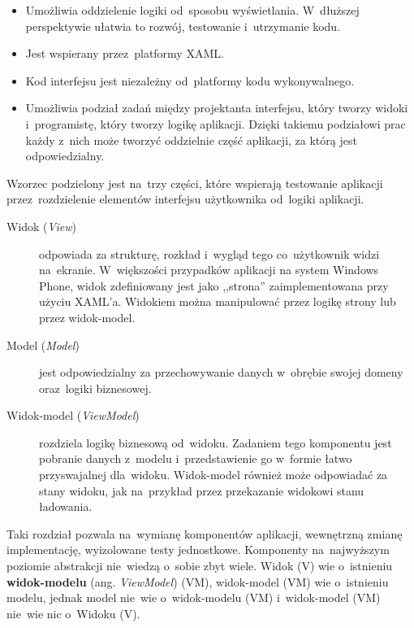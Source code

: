\documentclass[a4paper,twoside,titlepage,openright]{book}
\begin{document}
\begin{itemize}

	\item Umożliwia oddzielenie logiki od~sposobu wyświetlania. W~dłuższej perspektywie ułatwia to rozwój, testowanie i~utrzymanie kodu.
	\item Jest wspierany przez~platformy XAML.
	\item Kod interfejsu jest niezależny od~platformy kodu wykonywalnego.
	\item Umożliwia podział zadań między projektanta interfejsu, który tworzy widoki i~programistę, który tworzy logikę aplikacji. Dzięki takiemu podziałowi prac każdy z~nich może tworzyć oddzielnie część aplikacji, za którą jest odpowiedzialny.
\end{itemize}

Wzorzec podzielony jest na~trzy części, które wspierają testowanie aplikacji przez~rozdzielenie elementów interfejsu użytkownika od~logiki aplikacji.
\begin{description}

	\item[Widok (\textit{View})] odpowiada za strukturę, rozkład i~wygląd tego co~użytkownik widzi na~ekranie. W~większości przypadków aplikacji na system Windows Phone, widok zdefiniowany jest jako ,,strona'' zaimplementowana przy użyciu XAML’a. Widokiem można manipulować przez logikę strony lub przez widok-model.
	
	\item[Model (\textit{Model})] jest odpowiedzialny za przechowywanie danych w~obrębie swojej domeny oraz~logiki biznesowej.
	
	\item[Widok-model (\textit{ViewModel})] rozdziela logikę biznesową od~widoku. Zadaniem tego komponentu jest pobranie danych z~modelu i~przedstawienie go w~formie łatwo przyswajalnej dla~widoku. Widok-model również może odpowiadać za stany widoku, jak na~przykład przez przekazanie widokowi stanu ładowania.

\end{description}

Taki rozdział pozwala na~wymianę komponentów aplikacji, wewnętrzną zmianę implementację, wyizolowane testy jednostkowe. Komponenty na~najwyższym poziomie abstrakcji nie~wiedzą o~sobie zbyt wiele. Widok (V) wie o~istnieniu \textbf{widok-modelu} (ang. \textit{ViewModel}) (VM), widok-model (VM) wie o~istnieniu modelu, jednak model nie~wie o~widok-modelu (VM) i~widok-model (VM) nie~wie nic o~Widoku (V).
\end{document}
